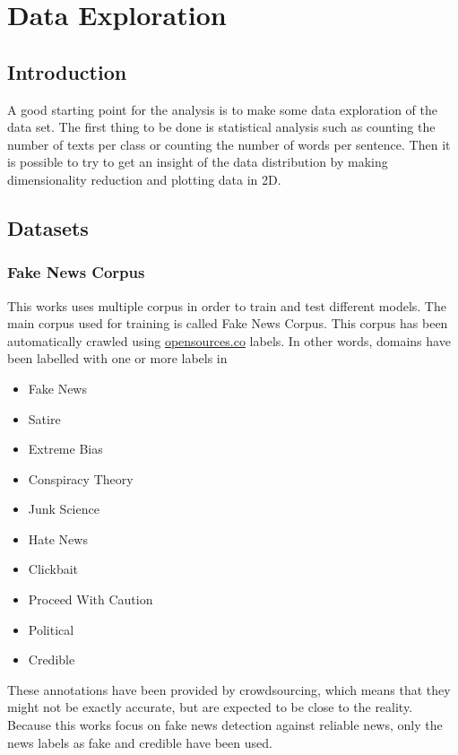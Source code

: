 ﻿
\chapter{Data Exploration} \label{chap2}
\section{Introduction}
A good starting point for the analysis is to make some data exploration of the data set. The first thing to be done is statistical analysis such as counting the number of texts per class or counting the number of words per sentence. Then it is possible to try to get an insight of the data distribution by making dimensionality reduction and plotting data in 2D. 
\section{Datasets} \label{intro:dataset}
\subsection{Fake News Corpus}
This works uses multiple corpus in order to train and test different models. The main corpus used for training is called Fake News Corpus\cite{Szpakowski}. This corpus has been automatically crawled using \url{opensources.co} labels. In other words, domains have been labelled with one or more labels in \begin{itemize}
  \item Fake News
  \item Satire
  \item Extreme Bias
  \item Conspiracy Theory
  \item Junk Science
  \item Hate News
  \item Clickbait
  \item Proceed With Caution
  \item Political
  \item Credible
\end{itemize}
These annotations have been provided by crowdsourcing, which means that they might not be exactly accurate, but are expected to be close to the reality. Because this works focus on fake news detection against reliable news, only the news labels as fake and credible have been used. 

